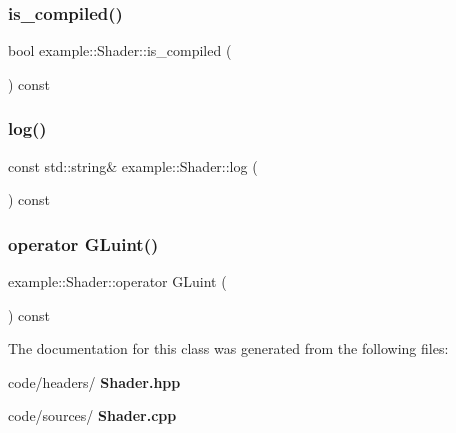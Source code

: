 \mbox{\label{classexample_1_1_shader_abd0acb5a26b8829d6e81908b487fa329}} 
\subsubsection{is\_compiled()}
{\footnotesize\ttfamily bool example\+::\+Shader\+::is\+\_\+compiled (\begin{DoxyParamCaption}{ }\end{DoxyParamCaption}) const\hspace{0.3cm}{\ttfamily [inline]}}

\mbox{\label{classexample_1_1_shader_a4d5153ab0443d4747e076ad9e6d88d1c}} 
\subsubsection{log()}
{\footnotesize\ttfamily const std\+::string\& example\+::\+Shader\+::log (\begin{DoxyParamCaption}{ }\end{DoxyParamCaption}) const\hspace{0.3cm}{\ttfamily [inline]}}

\mbox{\label{classexample_1_1_shader_aa2639e785a366ebe1837e550833150e8}} 
\subsubsection{operator GLuint()}
{\footnotesize\ttfamily example\+::\+Shader\+::operator G\+Luint (\begin{DoxyParamCaption}{ }\end{DoxyParamCaption}) const\hspace{0.3cm}{\ttfamily [inline]}}



The documentation for this class was generated from the following files\+:\begin{DoxyCompactItemize}
\item 
code/headers/\textbf{ Shader.\+hpp}\item 
code/sources/\textbf{ Shader.\+cpp}\end{DoxyCompactItemize}
